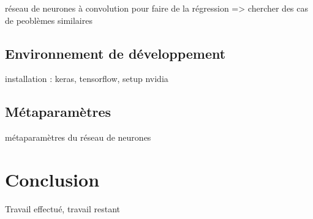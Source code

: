 \documentclass[a4paper, 11pt]{report}
\begin{document}
réseau de neurones à convolution pour faire de la régression => chercher des cas de peoblèmes similaires

\section{Environnement de développement}
installation : keras, tensorflow, setup nvidia

\section{Métaparamètres}
métaparamètres du réseau de neurones

\chapter{Conclusion}
Travail effectué, travail restant

\printbibliography





\listoffigures

\end{document}
